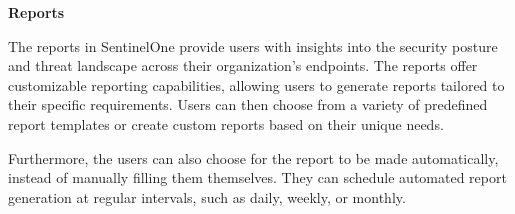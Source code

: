 \textbf{Reports}

The reports in SentinelOne provide users with insights into the security posture and threat landscape across their organization's
endpoints. The reports offer customizable reporting capabilities, allowing users to generate reports tailored to their specific
requirements. Users can then choose from a variety of predefined report templates or create custom reports based on their unique
needs.

Furthermore, the users can also choose for the report to be made automatically, instead of manually filling them themselves. They can
schedule automated report generation at regular intervals, such as daily, weekly, or monthly.







